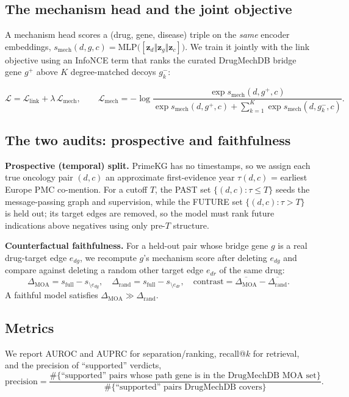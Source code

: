 \documentclass[11pt]{article}
\newcommand{\zd}{\mathbf{z}}
\begin{document}
\subsection{The mechanism head and the joint objective}
\begin{sloppypar}
A mechanism head scores a (drug, gene, disease) triple on the \emph{same} encoder
embeddings, $s_{\text{mech}}(d,g,c)=\mathrm{MLP}\big([\zd_d\Vert\zd_g\Vert\zd_c]\big)$.
We train it jointly with the link objective using an InfoNCE term that ranks the curated
DrugMechDB bridge gene $g^{+}$ above $K$ degree-matched decoys $g^{-}_k$:
\end{sloppypar}
\begin{equation}
\mathcal{L} = \mathcal{L}_{\text{link}} + \lambda\,\mathcal{L}_{\text{mech}},
\qquad
\mathcal{L}_{\text{mech}} = -\log
\frac{\exp s_{\text{mech}}(d,g^{+},c)}
     {\exp s_{\text{mech}}(d,g^{+},c)+\sum_{k=1}^{K}\exp s_{\text{mech}}(d,g^{-}_k,c)}.
\label{eq:infonce}
\end{equation}

\subsection{The two audits: prospective and faithfulness}
\textbf{Prospective (temporal) split.} PrimeKG has no timestamps, so we assign each true
oncology pair $(d,c)$ an approximate first-evidence year $\tau(d,c)$ = earliest Europe PMC
co-mention. For a cutoff $T$, the PAST set $\{(d,c):\tau\le T\}$ seeds the
message-passing graph and supervision, while the FUTURE set $\{(d,c):\tau> T\}$ is held
out; its target edges are removed, so the model must rank future indications above
negatives using only pre-$T$ structure.

\textbf{Counterfactual faithfulness.} For a held-out pair whose bridge gene $g$ is a real
drug-target edge $e_{dg}$, we recompute $g$'s mechanism score after deleting $e_{dg}$ and
compare against deleting a random other target edge $e_{dr}$ of the same drug:
\begin{equation}
\Delta_{\text{MOA}} = s_{\text{full}} - s_{\setminus e_{dg}},\quad
\Delta_{\text{rand}} = s_{\text{full}} - s_{\setminus e_{dr}},\quad
\text{contrast} = \overline{\Delta_{\text{MOA}}} - \overline{\Delta_{\text{rand}}}.
\label{eq:faith}
\end{equation}
A faithful model satisfies $\Delta_{\text{MOA}}\gg\Delta_{\text{rand}}$.

\subsection{Metrics}
We report AUROC and AUPRC for separation/ranking, recall@$k$ for retrieval, and the
precision of ``supported'' verdicts,
\begin{equation}
\text{precision} =
\frac{\#\{\text{``supported'' pairs whose path gene is in the DrugMechDB MOA set}\}}
     {\#\{\text{``supported'' pairs DrugMechDB covers}\}}.
\label{eq:prec}
\end{equation}
\end{document}
